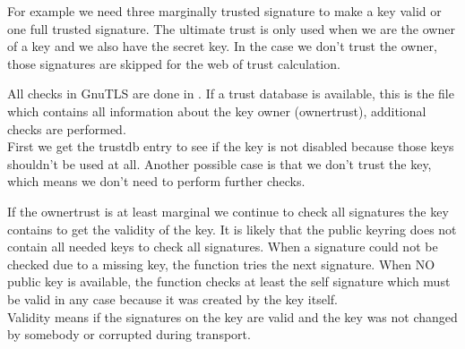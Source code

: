 For example we need three marginally trusted signature to make a key
valid or one full trusted signature. The ultimate trust is only used
when we are the owner of a key and we also have the secret key.
In the case we don't trust the owner, those signatures are skipped
for the web of trust calculation.
\par
All checks in GnuTLS are done in . 
If a trust database is available, this is the file which contains all information about the
key owner (ownertrust), additional checks are performed.
\\
First we get the trustdb entry to see if the key is not disabled because
those keys shouldn't be used at all. Another possible case is that we
don't trust the key, which means we don't need to perform further checks.
\par
If the ownertrust is at least marginal we continue to check all signatures
the key contains to get the validity of the key. It is likely that the
public keyring does not contain all needed keys to check all signatures.
When a signature could not be checked due to a missing key, the function 
tries the next signature. When NO public key is available, the function
checks at least the self signature which must be valid in any case because
it was created by the key itself.
\\
Validity means if the signatures on the key are valid and the key was not 
changed by somebody or corrupted during transport.

